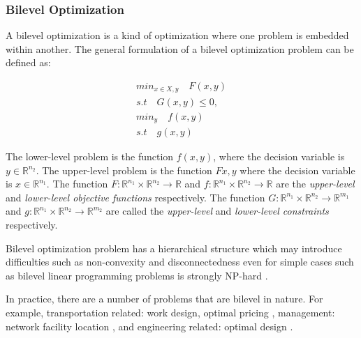 \subsubsection{Bilevel Optimization}
\label{bilevel}

A bilevel optimization \cite{Colson:2007bu} is a kind of optimization where one problem is embedded within another.
The general formulation of a bilevel optimization problem can be defined as: 

\begin{subequations}
\label{eq:bilevel}
	\begin{align}
	min_{x \in X, y} 	\quad F(x, y) \\
	s.t 			\quad G(x, y) \leq 0, \\
	min_y			\quad f(x, y) \\
	s.t 			\quad g(x, y)
	\end{align}
\end{subequations}

The lower-level problem is the function $f(x, y)$, where the decision variable is $y \in \mathbb{R}^{n_2}$. The upper-level problem is the function $F{x, y}$ where the decision variable is $x \in \mathbb{R}^{n_1}$.
The function $F : \mathbb{R}^{n_1} \times  \mathbb{R}^{n_2} \to \mathbb{R}$ and $f : \mathbb{R}^{n_1} \times  \mathbb{R}^{n_2} \to \mathbb{R}$ are the \emph{upper-level} and \emph{lower-level objective functions} respectively. The function $G : \mathbb{R}^{n_1} \times  \mathbb{R}^{n_2} \to \mathbb{R}^{m_1}$ and $g : \mathbb{R}^{n_1} \times  \mathbb{R}^{n_2} \to \mathbb{R}^{m_2}$ are called the \emph{upper-level} and \emph{lower-level constraints} respectively. 

Bilevel optimization problem has a hierarchical structure which may introduce difficulties such as non-convexity and disconnectedness even for simple cases such as bilevel linear programming problems is strongly NP-hard \cite{Sinha:2013tn}. 

In practice, there are a number of problems that are bilevel in nature. For example, transportation related: work design, optimal pricing \cite{Brotcorne:2001je, Constantin:1995hu}, management: network facility location \cite{Sun:2008gq},  and engineering related: optimal design \cite{KirjnerNeto:1998ef}. 


